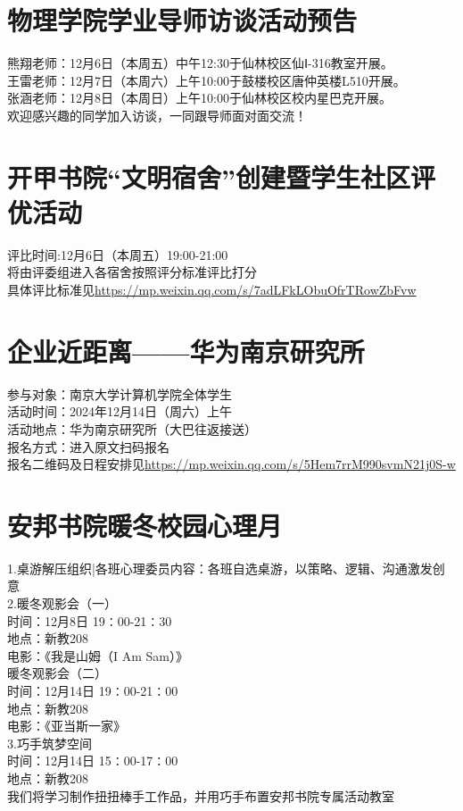 \documentclass[letterpaper, 12pt]{article}
\begin{document}
\begin{multicols}{2}
\section{物理学院学业导师访谈活动预告}
熊翔老师：12月6日（本周五）中午12:30于仙林校区仙Ⅰ-316教室开展。\\
王雷老师：12月7日（本周六）上午10:00于鼓楼校区唐仲英楼L510开展。\\
张涵老师：12月8日（本周日）上午10:00于仙林校区校内星巴克开展。\\
欢迎感兴趣的同学加入访谈，一同跟导师面对面交流！\\

\section{开甲书院“文明宿舍”创建暨学生社区评优活动}
评比时间:12月6日（本周五）19:00-21:00\\
将由评委组进入各宿舍按照评分标准评比打分\\
具体评比标准见\url{https://mp.weixin.qq.com/s/7adLFkLObuOfrTRowZbFvw}

\section{企业近距离——华为南京研究所}
参与对象：南京大学计算机学院全体学生\\
活动时间：2024年12月14日（周六）上午\\
活动地点：华为南京研究所（大巴往返接送）\\
报名方式：进入原文扫码报名\\
报名二维码及日程安排见\url{https://mp.weixin.qq.com/s/5Hem7rrM990svmN21j0S-w}

\section{安邦书院暖冬校园心理月}
1.桌游解压组织|各班心理委员内容：各班自选桌游，以策略、逻辑、沟通激发创意\\
2.暖冬观影会（一）\\
时间：12月8日 19∶00-21∶30\\
地点：新教208\\
电影：《我是山姆（I Am Sam）》\\
暖冬观影会（二）\\
时间：12月14日 19∶00-21∶00\\
地点：新教208\\
电影：《亚当斯一家》\\
3.巧手筑梦空间\\
时间：12月14日 15∶00-17∶00\\
地点：新教208\\
我们将学习制作扭扭棒手工作品，并用巧手布置安邦书院专属活动教室\\


\end{multicols}
\end{document}
